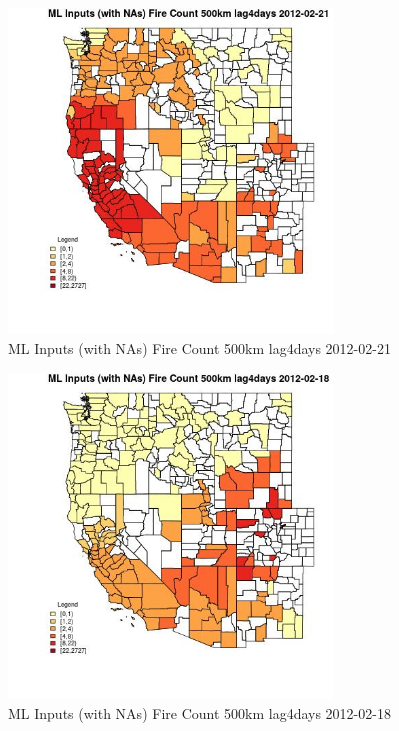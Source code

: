 \begin{figure} 
\centering  
\includegraphics[width=0.77\textwidth]{Code_Outputs/Report_ML_input_PM25_Step4_part_f_de_duplicated_aves_prioritize_24hr_obswNAs_CountyFire_Count_500km_lag4daysMean2012-02-21.jpg} 
\caption{\label{fig:Report_ML_input_PM25_Step4_part_f_de_duplicated_aves_prioritize_24hr_obswNAsCountyFire_Count_500km_lag4daysMean2012-02-21}ML Inputs (with NAs) Fire Count 500km lag4days 2012-02-21} 
\end{figure} 
 

\begin{figure} 
\centering  
\includegraphics[width=0.77\textwidth]{Code_Outputs/Report_ML_input_PM25_Step4_part_f_de_duplicated_aves_prioritize_24hr_obswNAs_CountyFire_Count_500km_lag4daysMean2012-02-18.jpg} 
\caption{\label{fig:Report_ML_input_PM25_Step4_part_f_de_duplicated_aves_prioritize_24hr_obswNAsCountyFire_Count_500km_lag4daysMean2012-02-18}ML Inputs (with NAs) Fire Count 500km lag4days 2012-02-18} 
\end{figure} 
 

